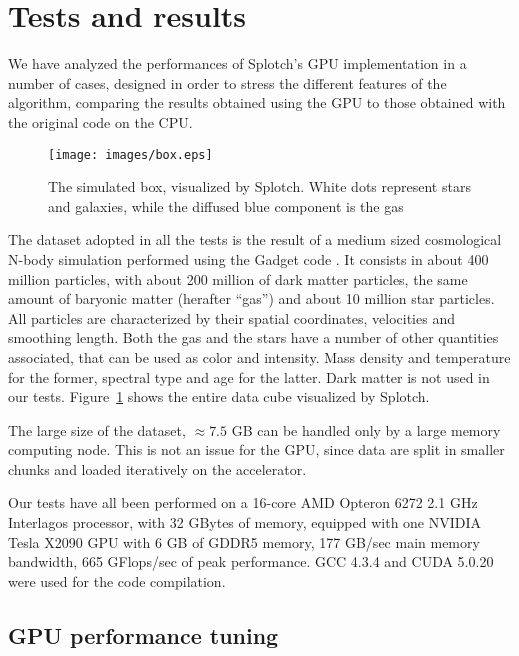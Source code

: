 \documentclass[11pt]{article}
\begin{document}
\section{Tests and results}
\label{sec:results}

We have analyzed the performances of Splotch's GPU implementation in a number of cases, designed in 
order to stress the different features of the algorithm, 
comparing the results 
obtained using the GPU to those obtained with the original code on the CPU. 

\begin{figure}
\centering
\texttt{[image: images/box.eps]}
\caption{The simulated box, visualized by Splotch. White dots represent stars and galaxies, while the 
diffused blue component is the gas}
\label{fig:box}
\end{figure}

The dataset adopted in all the tests is the result of a medium sized cosmological 
N-body simulation performed using the Gadget code \cite{gadgeturl}. It consists in about 
400 million particles, with about 200 million of dark matter particles, the same amount 
of baryonic matter (herafter ``gas'') and about 10 million star particles. 
All particles are characterized by their spatial coordinates, velocities
and smoothing length. 
Both the gas and the stars have a number of other quantities associated, that can be used 
as color and intensity. Mass density and temperature for the former, spectral type and age
for the latter. Dark matter is not used in our tests. Figure~\ref{fig:box} shows 
the entire data cube visualized by Splotch.

The large size of the dataset, $\approx 7.5$ GB can be handled only by a large memory computing node. 
This is not an issue for the GPU, since data are split 
in smaller chunks and loaded iteratively on the accelerator. 

Our tests have all been performed on a 16-core AMD Opteron 6272 2.1 GHz Interlagos processor,
with 32 GBytes of memory, equipped with one NVIDIA Tesla X2090 GPU with 6 GB of GDDR5 memory,
177 GB/sec 
main memory bandwidth, 665 GFlops/sec of peak performance. GCC 4.3.4 and CUDA 5.0.20 
were used for the code compilation.

\subsection{GPU performance tuning}
\label{sec:gpuperf}

\end{document}
